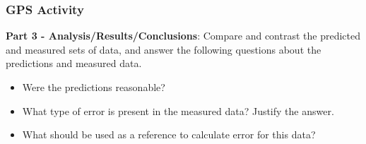 \documentclass[fleqn]{beamer} %
\newcommand{\sectionIsubsectionIVtitle}{GPS Activity}
\begin{document}
			\begin{frame}
				\frametitle{\sectionIsubsectionIVtitle}

				\scriptsize
				{\bf Part 3 - Analysis/Results/Conclusions}: Compare and contrast the predicted and measured sets of data, and answer the following questions about the predictions and measured data.
				\begin{multicols}{2}

					\begin{itemize}
						\item Were the predictions reasonable?\\
						\item What type of error is present in the measured data? Justify the answer. \\
						\item What should be used as a reference to calculate error for this data? \\ 
					\end{itemize}
					

\end{multicols}
\end{frame}
\end{document}
